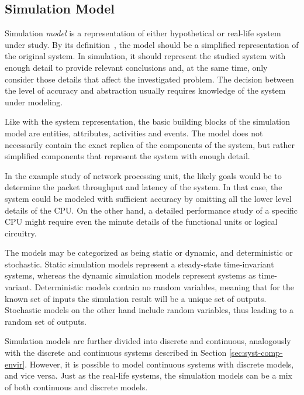 \subsection{Simulation Model}
\label{sec:simulation-model}

Simulation \emph{model} is a representation of either hypothetical or real-life system under study. By its definition~\cite{Encyclopedia of computer science}, the model should be a simplified representation of the original system. In simulation, it should represent the studied system with enough detail to provide relevant conclusions and, at the same time, only consider those details that affect the investigated problem. The decision between the level of accuracy and abstraction usually requires knowledge of the system under modeling.~\cite{Banks:2010:DES}

Like with the system representation, the basic building blocks of the simulation model are entities, attributes, activities and events. The model does not necessarily contain the exact replica of the components of the system, but rather simplified components that represent the system with enough detail.~\cite{Banks:2010:DES}

In the example study of network processing unit, the likely goals would be to determine the packet throughput and latency of the system. In that case, the system could be modeled with sufficient accuracy by omitting all the lower level details of the CPU. On the other hand, a detailed performance study of a specific CPU might require even the minute details of the functional units or logical circuitry.~\cite{TODO: find some simulation example for this}

The models may be categorized as being static or dynamic, and deterministic or stochastic. Static simulation models represent a steady-state time-invariant systems, whereas the dynamic simulation models represent systems as time-variant. Deterministic models contain no random variables, meaning that for the known set of inputs the simulation result will be a unique set of outputs. Stochastic models on the other hand include random variables, thus leading to a random set of outputs.~\cite{Banks:2010:DES}

Simulation models are further divided into discrete and continuous, analogously with the discrete and continuous systems described in Section \ref{sec:syst-comp-envir}. However, it is possible to model continuous systems with discrete models, and vice versa. Just as the real-life systems, the simulation models can be a mix of both continuous and discrete models.~\cite{Banks:2010:DES}

